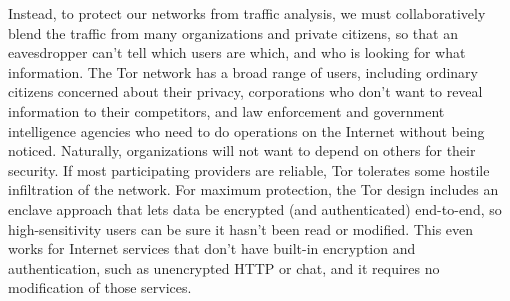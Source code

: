 \documentclass{llncs}
\begin{document}
Instead, to protect our networks from traffic analysis, we must
collaboratively blend the traffic from many organizations and private
citizens, so that an eavesdropper can't tell which users are which,
and who is looking for what information.  %
The Tor network has a broad range of users, including ordinary citizens
concerned about their privacy, corporations
who don't want to reveal information to their competitors, and law
enforcement and government intelligence agencies who need
to do operations on the Internet without being noticed.
Naturally, organizations will not want to depend on others for their
security.  If most participating providers are reliable, Tor tolerates
some hostile infiltration of the network.  For maximum protection,
the Tor design includes an enclave approach that lets data be encrypted
(and authenticated) end-to-end, so high-sensitivity users can be sure it
hasn't been read or modified.  This even works for Internet services that
don't have built-in encryption and authentication, such as unencrypted
HTTP or chat, and it requires no modification of those services.
\end{document}
